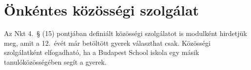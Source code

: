 \hypertarget{onkentes-kozossegi-szolgalat}{%
\section{Önkéntes közösségi
szolgálat}\label{onkentes-kozossegi-szolgalat}}

Az Nkt 4.~§ (15) pontjában definiált közösségi szolgálatot is modulként
hirdetjük meg, amit a 12.~évét már betöltött gyerek választhat csak.
Közösségi szolgálatként elfogadható, ha a Budapest School iskola egy
másik tanulóközösségében segít a gyerek.

